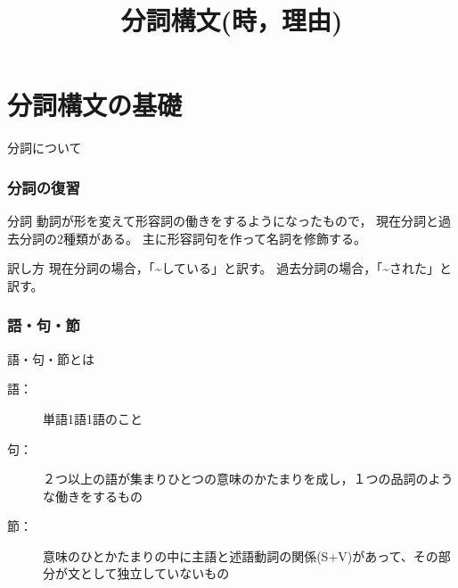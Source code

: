 \documentclass[xcolor=dvipsnames,unicode,14pt]{beamer}%
\title{分詞構文(時，理由)}
\begin{document}
\frame{\maketitle}

\begin{frame}
  \tableofcontents
\end{frame}
\section{分詞構文の基礎}
\begin{frame}
  \centering
  \LARGE 分詞について

\end{frame}
\begin{frame}
  \frametitle{分詞の復習}
  \begin{block}{分詞}
    動詞が形を変えて形容詞の働きをするようになったもので，
    現在分詞と過去分詞の2種類がある。
    主に形容詞句を作って名詞を修飾する。
  \end{block}
  \begin{block}{訳し方}
    現在分詞の場合，「\textasciitilde している」と訳す。
    過去分詞の場合，「\textasciitilde された」と訳す。
  \end{block}
\end{frame}

\begin{frame}
  \frametitle{語・句・節}
  語・句・節とは
  \pause
  \begin{description}
    \item[語：] 単語1語1語のこと
    \item[句：] ２つ以上の語が集まりひとつの意味のかたまりを成し，１つの品詞のような働きをするもの
    \item[節：] 意味のひとかたまりの中に主語と述語動詞の関係(S+V)があって、その部分が文として独立していないもの
  \end{description}
  \pause

\end{frame}
\end{document}
